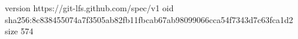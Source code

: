 version https://git-lfs.github.com/spec/v1
oid sha256:8c838455074a7f3505ab82fb11fbcab67ab98099066cca54f7343d7c63fca1d2
size 574
